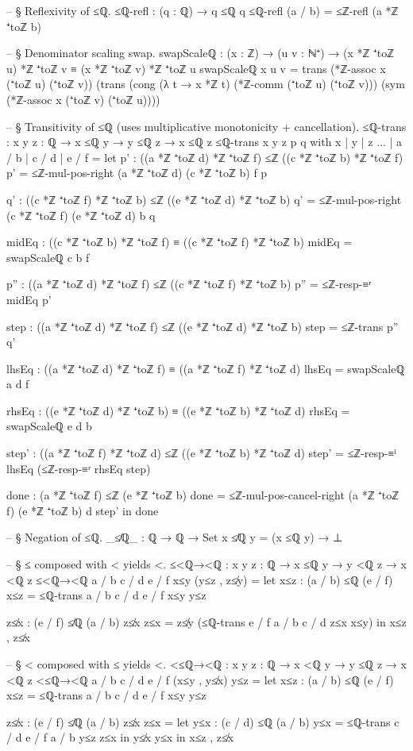 \documentclass[11pt,a4paper]{book}
\begin{document}
\begin{code}
-- § Reflexivity of ≤ℚ.
≤ℚ-refl : (q : ℚ) → q ≤ℚ q
≤ℚ-refl (a / b) = ≤ℤ-refl (a *ℤ ⁺toℤ b)

-- § Denominator scaling swap.
swapScaleℚ : (x : ℤ) → (u v : ℕ⁺) → (x *ℤ ⁺toℤ u) *ℤ ⁺toℤ v ≡ (x *ℤ ⁺toℤ v) *ℤ ⁺toℤ u
swapScaleℚ x u v =
  trans
    (*ℤ-assoc x (⁺toℤ u) (⁺toℤ v))
    (trans
      (cong (λ t → x *ℤ t) (*ℤ-comm (⁺toℤ u) (⁺toℤ v)))
      (sym (*ℤ-assoc x (⁺toℤ v) (⁺toℤ u))))

-- § Transitivity of ≤ℚ (uses multiplicative monotonicity + cancellation).
≤ℚ-trans : {x y z : ℚ} → x ≤ℚ y → y ≤ℚ z → x ≤ℚ z
≤ℚ-trans {x} {y} {z} p q with x | y | z
... | a / b | c / d | e / f =
  let
    p' : ((a *ℤ ⁺toℤ d) *ℤ ⁺toℤ f) ≤ℤ ((c *ℤ ⁺toℤ b) *ℤ ⁺toℤ f)
    p' = ≤ℤ-mul-pos-right (a *ℤ ⁺toℤ d) (c *ℤ ⁺toℤ b) f p

    q' : ((c *ℤ ⁺toℤ f) *ℤ ⁺toℤ b) ≤ℤ ((e *ℤ ⁺toℤ d) *ℤ ⁺toℤ b)
    q' = ≤ℤ-mul-pos-right (c *ℤ ⁺toℤ f) (e *ℤ ⁺toℤ d) b q

    midEq : ((c *ℤ ⁺toℤ b) *ℤ ⁺toℤ f) ≡ ((c *ℤ ⁺toℤ f) *ℤ ⁺toℤ b)
    midEq = swapScaleℚ c b f

    p'' : ((a *ℤ ⁺toℤ d) *ℤ ⁺toℤ f) ≤ℤ ((c *ℤ ⁺toℤ f) *ℤ ⁺toℤ b)
    p'' = ≤ℤ-resp-≡ʳ midEq p'

    step : ((a *ℤ ⁺toℤ d) *ℤ ⁺toℤ f) ≤ℤ ((e *ℤ ⁺toℤ d) *ℤ ⁺toℤ b)
    step = ≤ℤ-trans p'' q'

    lhsEq : ((a *ℤ ⁺toℤ d) *ℤ ⁺toℤ f) ≡ ((a *ℤ ⁺toℤ f) *ℤ ⁺toℤ d)
    lhsEq = swapScaleℚ a d f

    rhsEq : ((e *ℤ ⁺toℤ d) *ℤ ⁺toℤ b) ≡ ((e *ℤ ⁺toℤ b) *ℤ ⁺toℤ d)
    rhsEq = swapScaleℚ e d b

    step' : ((a *ℤ ⁺toℤ f) *ℤ ⁺toℤ d) ≤ℤ ((e *ℤ ⁺toℤ b) *ℤ ⁺toℤ d)
    step' = ≤ℤ-resp-≡ˡ lhsEq (≤ℤ-resp-≡ʳ rhsEq step)

    done : (a *ℤ ⁺toℤ f) ≤ℤ (e *ℤ ⁺toℤ b)
    done = ≤ℤ-mul-pos-cancel-right (a *ℤ ⁺toℤ f) (e *ℤ ⁺toℤ b) d step'
  in
  done

-- § Negation of ≤ℚ.
_≰ℚ_ : ℚ → ℚ → Set
x ≰ℚ y = (x ≤ℚ y) → ⊥

-- § ≤ composed with < yields <.
≤<ℚ→<ℚ : {x y z : ℚ} → x ≤ℚ y → y <ℚ z → x <ℚ z
≤<ℚ→<ℚ {a / b} {c / d} {e / f} x≤y (y≤z , z≰y) =
  let
    x≤z : (a / b) ≤ℚ (e / f)
    x≤z = ≤ℚ-trans {a / b} {c / d} {e / f} x≤y y≤z

    z≰x : (e / f) ≰ℚ (a / b)
    z≰x z≤x = z≰y (≤ℚ-trans {e / f} {a / b} {c / d} z≤x x≤y)
  in
  x≤z , z≰x

-- § < composed with ≤ yields <.
<≤ℚ→<ℚ : {x y z : ℚ} → x <ℚ y → y ≤ℚ z → x <ℚ z
<≤ℚ→<ℚ {a / b} {c / d} {e / f} (x≤y , y≰x) y≤z =
  let
    x≤z : (a / b) ≤ℚ (e / f)
    x≤z = ≤ℚ-trans {a / b} {c / d} {e / f} x≤y y≤z

    z≰x : (e / f) ≰ℚ (a / b)
    z≰x z≤x =
      let
        y≤x : (c / d) ≤ℚ (a / b)
        y≤x = ≤ℚ-trans {c / d} {e / f} {a / b} y≤z z≤x
      in
      y≰x y≤x
  in
  x≤z , z≰x
\end{code}
\end{document}
